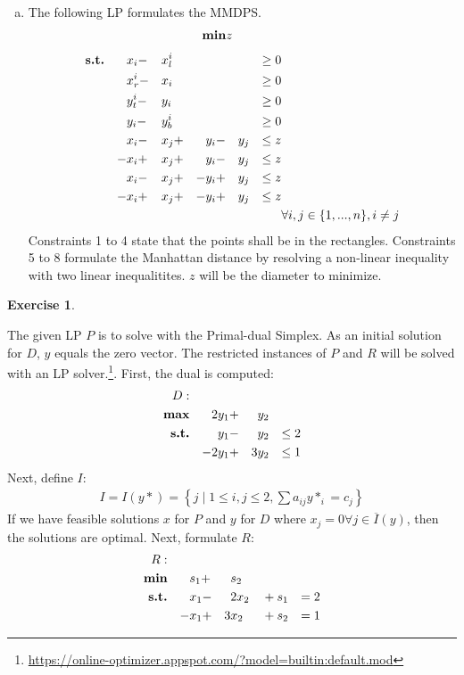 \documentclass[a4paper,12pt,headsepline]{scrartcl}
\newtheorem{aufgabe}{Exercise}
\begin{document}
\begin{enumerate}[a)]
\item The following LP formulates the MMDPS. 
\begin{align*}
	\textbf{\text{min}} & z && && & &
\end{align*}
\begin{align}
	\textbf{\text{s.t.}} & &&x_i - &&x_l^i&&&& &\geq 0&\\
	                     & &&x_r^i - &&x_i&&&& &\geq 0&\\
	                     & &&y_t^i - &&y_i&&&& &\geq 0&\\
	                     & &&y_i - && y_b^i &&&& &\geq 0 &\\
	                     & && x_i - &&x_j + &&y_i - &&y_j &\leq z&\\
	                     & & -&x_i + &&x_j + &&y_i - &&y_j &\leq z&\\
	                     & && x_i - &&x_j + &-&y_i + &&y_j &\leq z&\\
	                     & & -&x_i + &&x_j + &-&y_i + &&y_j &\leq z&\\
	                     &&&&&&&&&&&\forall i,j\in \{1,...,n\}, i\neq j
\end{align}
Constraints 1 to 4 state that the points shall be in the rectangles. Constraints 5 to 8 formulate the Manhattan distance by resolving a non-linear inequality with two linear inequalitites. $z$ will be the diameter to minimize.
\end{enumerate}

\newpage
\begin{aufgabe}
\end{aufgabe}
The given LP $P$ is to solve with the Primal-dual Simplex. As an initial solution for $D$, $y$ equals the zero vector. The restricted instances of $P$ and $R$ will be solved with an LP solver.\footnote{\hyperlink{https://online-optimizer.appspot.com/?model=builtin:default.mod}{https://online-optimizer.appspot.com/?model=builtin:default.mod}}. First, the dual is computed:
\begin{align*}D:\\
\textbf{\text{max}} & &2&y_1 + &&y_2 &\\
\textbf{\text{s.t.}} & &&y_1 - &&y_2 & \leq 2\\
& &-2&y_1 + &3&y_2 & \leq 1
\end{align*}
Next, define $I$:
\begin{align*}
I = I(y*) = \left\{ j\mid 1 \leq i,j \leq 2, \sum a_{ij}y*_i =c_j \right\} 
\end{align*}
If we have feasible solutions $x$ for $P$ and $y$ for $D$ where $x_j=0 \forall j\in \overline{I}(y)$, then the solutions are optimal. Next, formulate $R$:
\begin{align*}R:\\
\textbf{\text{min}} & &&s_1 + &&s_2 &&&\\
\textbf{\text{s.t.}} & &&x_1 - &&2x_2 &&+s_1 &= 2\\
& &-&x_1 + &3&x_2 && + s_2 & = 1
\end{align*}
\end{document}
